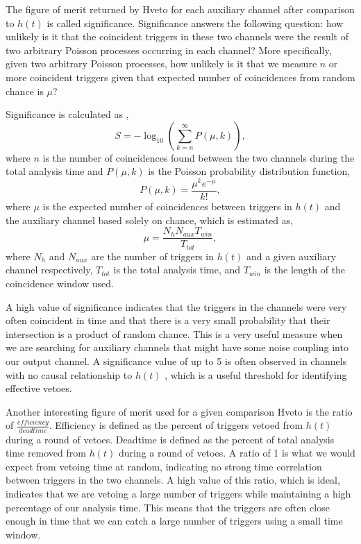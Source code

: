 The figure of merit returned by Hveto for each auxiliary channel 
after comparison to $h(t)$ is called significance.
Significance answers the following question: how unlikely is it that 
the coincident triggers in these two channels were the result of 
two arbitrary Poisson processes occurring in each channel? 
More specifically, given two arbitrary Poisson processes, how 
unlikely is it that we measure $n$ or more coincident triggers 
given that expected number of coincidences from random chance is $\mu$?

Significance is calculated as \cite{Smith:2011},
\begin{equation}
S = -\log_{10} (\sum\limits_{k = n}^{\infty} P(\mu,k)),
\end{equation}
where $n$ is the number of coincidences found between the two channels 
during the total analysis time and $P(\mu,k)$ is the Poisson probability 
distribution function,
\begin{equation}
P(\mu,k) = \frac{\mu^{k}e^{-\mu}}{k!},
\end{equation}
where $\mu$ is the expected number of coincidences between triggers in 
$h(t)$ and the auxiliary channel based solely on chance, which is estimated as,
\begin{equation}
\mu = \frac{N_{h}N_{aux}T_{win}}{T_{tot}},
\end{equation}
where $N_{h}$ and $N_{aux}$ are the number of triggers in $h(t)$ and a 
given auxiliary channel respectively, 
$T_{tot}$ is the total analysis time, and $T_{win}$ is the length of the 
coincidence window used.

A high value of significance indicates that the triggers in the channels 
were very often coincident in time and that there is a very small probability 
that their intersection is a product of random chance. This is a very useful 
measure when we are searching for auxiliary channels that might have some 
noise coupling into our output channel. A significance value of up to 5 is 
often observed in channels with no causal relationship to $h(t)$ \cite{Smith:2011}, 
which is a useful threshold for identifying effective vetoes.

Another interesting figure of merit used for a given comparison Hveto is 
the ratio of $\frac{efficiency}{deadtime}$. Efficiency is defined as the 
percent of triggers vetoed from $h(t)$ during a round of vetoes. Deadtime 
is defined as the percent of total analysis time removed from $h(t)$ during 
a round of vetoes. A ratio of 1 is what we would expect from vetoing time 
at random, indicating no strong time correlation between triggers in the 
two channels. A high value of this ratio, which is ideal, indicates that 
we are vetoing a large number of triggers while maintaining a high percentage 
of our analysis time. This means that the triggers are often close enough 
in time that we can catch a large number of triggers using a small time window.


